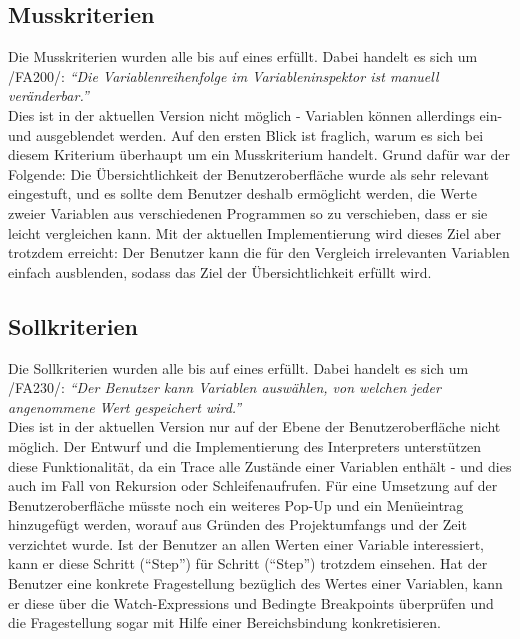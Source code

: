 \documentclass[parskip=full]{scrartcl}
\begin{document}
\subsection{Musskriterien}
Die Musskriterien wurden alle bis auf eines erfüllt. Dabei handelt es sich um /FA200/: \textit{\enquote{Die Variablenreihenfolge im Variableninspektor ist manuell veränderbar.}} \\ Dies ist in der aktuellen Version nicht möglich - Variablen können allerdings ein- und ausgeblendet werden. Auf den ersten Blick ist fraglich, warum es sich bei diesem Kriterium überhaupt um ein Musskriterium handelt. Grund dafür war der Folgende: Die Übersichtlichkeit der Benutzeroberfläche wurde als sehr relevant eingestuft, und es sollte dem Benutzer deshalb ermöglicht werden, die Werte zweier Variablen aus verschiedenen Programmen so zu verschieben, dass er sie leicht vergleichen kann. Mit der aktuellen Implementierung wird dieses Ziel aber trotzdem erreicht: Der Benutzer kann die für den Vergleich irrelevanten Variablen einfach ausblenden, sodass das Ziel der Übersichtlichkeit erfüllt wird.

\subsection{Sollkriterien}
Die Sollkriterien wurden alle bis auf eines erfüllt. Dabei handelt es sich um /FA230/: \textit{\enquote{Der Benutzer kann Variablen auswählen, von welchen jeder angenommene Wert gespeichert wird.}} \\
Dies ist in der aktuellen Version nur auf der Ebene der Benutzeroberfläche nicht möglich. Der Entwurf und die Implementierung des Interpreters unterstützen diese Funktionalität, da ein Trace alle Zustände einer Variablen enthält - und dies auch im Fall von Rekursion oder Schleifenaufrufen. Für eine Umsetzung auf der Benutzeroberfläche müsste noch ein weiteres Pop-Up und ein Menüeintrag hinzugefügt werden, worauf aus Gründen des Projektumfangs und der Zeit verzichtet wurde. Ist der Benutzer an allen Werten einer Variable interessiert, kann er diese Schritt (\enquote{Step}) für Schritt (\enquote{Step}) trotzdem einsehen. Hat der Benutzer eine konkrete Fragestellung bezüglich des Wertes einer Variablen, kann er diese über die Watch-Expressions und Bedingte Breakpoints überprüfen und die Fragestellung sogar mit Hilfe einer Bereichsbindung konkretisieren.
\end{document}
